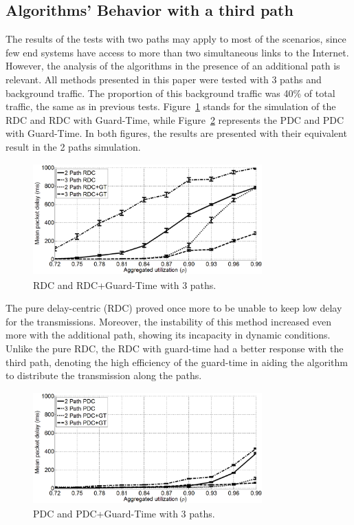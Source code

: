 \documentclass[letterpaper,10pt,oneside,conference,final]{sbrt2015}
\begin{document}
\subsection{Algorithms' Behavior with a third path}
The results of the tests with two paths may apply to most of the scenarios, since few end systems have access to more than two simultaneous links to the Internet. However, the analysis of the algorithms in the presence of an additional path is relevant. All methods presented in this paper were tested with 3 paths and background traffic. The proportion of this background traffic was 40\% of total traffic, the same as in previous tests. Figure~\ref{figura8} stands for the simulation of the RDC and RDC with Guard-Time, while Figure~\ref{figura9} represents the PDC and PDC with Guard-Time. In both figures, the results are presented with their equivalent result in the 2 paths simulation.

\begin{figure}[h!]
	\centering
	\includegraphics[width=8.8cm,height=4.3cm]{figura8}
	\caption{RDC and RDC+Guard-Time with 3 paths.}
	\label{figura8}
\end{figure}

The pure delay-centric (RDC) proved once more to be unable to keep low delay for the transmissions. Moreover, the instability of this method increased even more with the additional path, showing its incapacity in dynamic conditions. Unlike the pure RDC, the RDC with guard-time had a better response with the third path, denoting the high efficiency of the guard-time in aiding the algorithm to distribute the transmission along the paths.

\begin{figure}[h!]
	\centering
	\includegraphics[width=8.8cm,height=4.3cm]{figura9}
	\caption{PDC and PDC+Guard-Time with 3 paths.}
	\label{figura9}
\end{figure}
\end{document}
